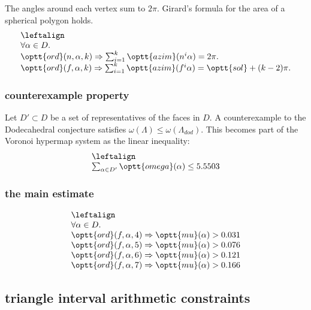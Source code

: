 The angles around each vertex sum to $2\pi$.  Girard's formula
for the area of a spherical polygon holds.
$$
\begin{array}{lll}
\leftalign\\
\forall \alpha\in D.\\ 
   \optt{ord}(n,\alpha,k) \Rightarrow
   \sum_{i=1}^k \optt{azim}(n^i\alpha )  = 2\pi.\\
   \optt{ord}(f,\alpha,k) \Rightarrow
   \sum_{i=1}^k \optt{azim}(f^i\alpha ) = \optt{sol} + (k -2)\pi.\\
   \end{array}
$$

\subsubsection{counterexample property}

\noindent
Let $D'\subset D$ be a set of representatives of the faces in $D$.
A counterexample to the Dodecahedral conjecture satisfies
$\omega(\Lambda) \le \omega(\Lambda_{dod})$.  This becomes part
of the Voronoi hypermap system as the linear inequality:
$$
\begin{array}{lll}
\leftalign\\
\sum_{\alpha\in D'} \optt{omega}(\alpha) \le 5.5503 \\
\end{array}
$$

\subsubsection{the main estimate}
$$
\begin{array}{lll}
\leftalign\\
\forall \alpha\in D.\\
   \optt{ord}(f,\alpha,4) \Rightarrow
   \optt{mu}(\alpha) > 0.031 \\
   \optt{ord}(f,\alpha,5) \Rightarrow
   \optt{mu}(\alpha) > 0.076 \\
   \optt{ord}(f,\alpha,6) \Rightarrow
   \optt{mu}(\alpha) > 0.121 \\
   \optt{ord}(f,\alpha,7) \Rightarrow
   \optt{mu}(\alpha) > 0.166 \\
\end{array}
$$




\subsection{triangle interval arithmetic constraints}\label{sec:tri}

